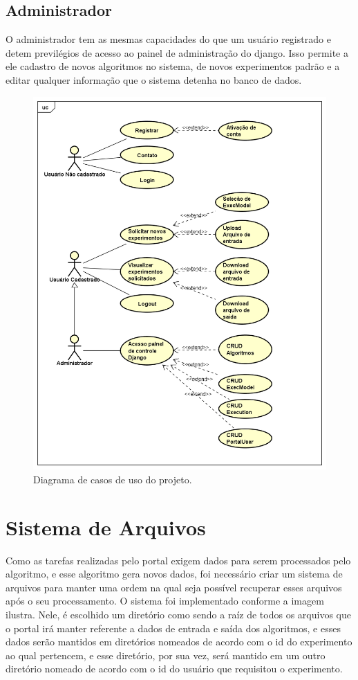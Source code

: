 \documentclass[tg]{mdtufsm}
\begin{document}
\subsection{Administrador}
O administrador tem as mesmas capacidades do que um usuário registrado e detem previlégios de acesso ao painel de administração do django. Isso permite a ele cadastro de novos algoritmos no sistema, de novos experimentos padrão e a editar qualquer informação que o sistema detenha no banco de dados.


\begin{figure}
	\centering
	\includegraphics[width=1\textwidth]{UseCase_tg}
	\caption{
		Diagrama de casos de uso do projeto.
	}
	\label{fig:path_tracing}
\end{figure}

\section{Sistema de Arquivos}
Como as tarefas realizadas pelo portal exigem dados para serem processados pelo algoritmo, e esse algoritmo gera novos dados, foi necessário criar um sistema de arquivos para manter uma ordem na qual seja possível recuperar esses arquivos após o seu processamento.
O sistema foi implementado conforme a imagem ilustra. Nele, é escolhido um diretório como sendo a raíz de todos os arquivos que o portal irá manter referente a dados de entrada e saída dos algoritmos, e esses dados serão mantidos em diretórios nomeados de acordo com o id do experimento ao qual pertencem, e esse diretório, por sua vez, será mantido em um outro diretório nomeado de acordo com o id do usuário que requisitou o experimento.
\end{document}
